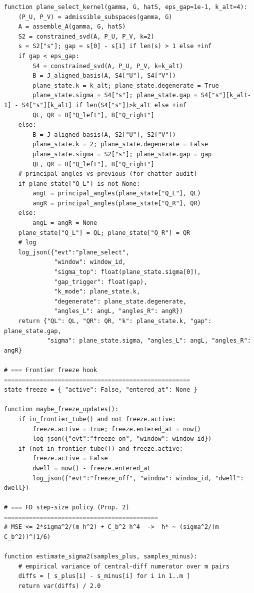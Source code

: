 \documentclass[10pt]{article}
\begin{document}
\begin{lstlisting}
function plane_select_kernel(gamma, G, hatS, eps_gap=1e-1, k_alt=4):
    (P_U, P_V) = admissible_subspaces(gamma, G)
    A = assemble_A(gamma, G, hatS)
    S2 = constrained_svd(A, P_U, P_V, k=2)
    s = S2["s"]; gap = s[0] - s[1] if len(s) > 1 else +inf
    if gap < eps_gap:
        S4 = constrained_svd(A, P_U, P_V, k=k_alt)
        B = J_aligned_basis(A, S4["U"], S4["V"])
        plane_state.k = k_alt; plane_state.degenerate = True
        plane_state.sigma = S4["s"]; plane_state.gap = S4["s"][k_alt-1] - S4["s"][k_alt] if len(S4["s"])>k_alt else +inf
        QL, QR = B["Q_left"], B["Q_right"]
    else:
        B = J_aligned_basis(A, S2["U"], S2["V"])
        plane_state.k = 2; plane_state.degenerate = False
        plane_state.sigma = S2["s"]; plane_state.gap = gap
        QL, QR = B["Q_left"], B["Q_right"]
    # principal angles vs previous (for chatter audit)
    if plane_state["Q_L"] is not None:
        angL = principal_angles(plane_state["Q_L"], QL)
        angR = principal_angles(plane_state["Q_R"], QR)
    else:
        angL = angR = None
    plane_state["Q_L"] = QL; plane_state["Q_R"] = QR
    # log
    log_json({"evt":"plane_select",
              "window": window_id,
              "sigma_top": float(plane_state.sigma[0]),
              "gap_trigger": float(gap),
              "k_mode": plane_state.k,
              "degenerate": plane_state.degenerate,
              "angles_L": angL, "angles_R": angR})
    return {"QL": QL, "QR": QR, "k": plane_state.k, "gap": plane_state.gap,
            "sigma": plane_state.sigma, "angles_L": angL, "angles_R": angR}

# === Frontier freeze hook ====================================================
state freeze = { "active": False, "entered_at": None }

function maybe_freeze_updates():
    if in_frontier_tube() and not freeze.active:
        freeze.active = True; freeze.entered_at = now()
        log_json({"evt":"freeze_on", "window": window_id})
    if (not in_frontier_tube()) and freeze.active:
        freeze.active = False
        dwell = now() - freeze.entered_at
        log_json({"evt":"freeze_off", "window": window_id, "dwell": dwell})

# === FD step-size policy (Prop. 2) ===========================================
# MSE <= 2*sigma^2/(m h^2) + C_b^2 h^4  ->  h* ~ (sigma^2/(m C_b^2))^(1/6)

function estimate_sigma2(samples_plus, samples_minus):
    # empirical variance of central-diff numerator over m pairs
    diffs = [ s_plus[i] - s_minus[i] for i in 1..m ]
    return var(diffs) / 2.0


\end{lstlisting}
\end{document}
